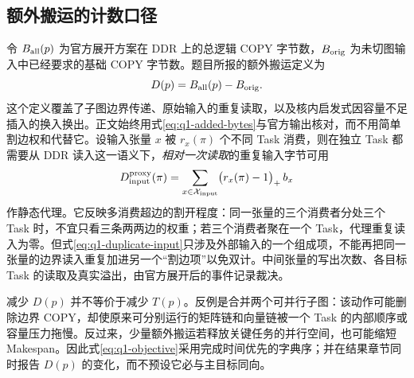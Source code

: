 \subsection{额外搬运的计数口径}
令 $B_{\rm all}(p)$ 为官方展开方案在 DDR 上的总逻辑 COPY 字节数，$B_{\rm orig}$ 为未切图输入中已经要求的基础 COPY 字节数。题目所报的额外搬运定义为
\begin{equation}\label{eq:q1-added-bytes}
D(p)=B_{\rm all}(p)-B_{\rm orig}.
\end{equation}
这个定义覆盖了子图边界传递、原始输入的重复读取，以及核内启发式因容量不足插入的换入换出。正文始终用式\eqref{eq:q1-added-bytes}与官方输出核对，而不用简单割边权和代替它。设输入张量 $x$ 被 $r_x(\pi)$ 个不同 Task 消费，则在独立 Task 都需要从 DDR 读入这一语义下，\emph{相对一次读取}的重复输入字节可用
\begin{equation}\label{eq:q1-duplicate-input}
D_{\rm input}^{\rm proxy}(\pi)=
\sum_{x\in\mathcal X_{\rm input}}\bigl(r_x(\pi)-1\bigr)_+\,b_x
\end{equation}
作静态代理。它反映多消费超边的割开程度：同一张量的三个消费者分处三个 Task 时，不宜只看三条两两边的权重；若三个消费者聚在一个 Task，代理重复读入为零。但式\eqref{eq:q1-duplicate-input}只涉及外部输入的一个组成项，不能再把同一张量的边界读入重复加进另一个“割边项”以免双计。中间张量的写出次数、各目标 Task 的读取及真实溢出，由官方展开后的事件记录裁决。

减少 $D(p)$ 并不等价于减少 $T(p)$。反例是合并两个可并行子图：该动作可能删除边界 COPY，却使原来可分别运行的矩阵链和向量链被一个 Task 的内部顺序或容量压力拖慢。反过来，少量额外搬运若释放关键任务的并行空间，也可能缩短 Makespan。因此式\eqref{eq:q1-objective}采用完成时间优先的字典序；并在结果章节同时报告 $D(p)$ 的变化，而不预设它必与主目标同向。

